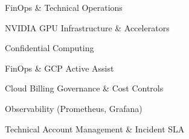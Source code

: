 \begin{skills}{FinOps \& Technical Operations}
    \item NVIDIA GPU Infrastructure \& Accelerators
    \item Confidential Computing
    \item FinOps \& GCP Active Assist
    \item Cloud Billing Governance \& Cost Controls
    \item Observability (Prometheus, Grafana)
    \item Technical Account Management \& Incident SLA
\end{skills}
